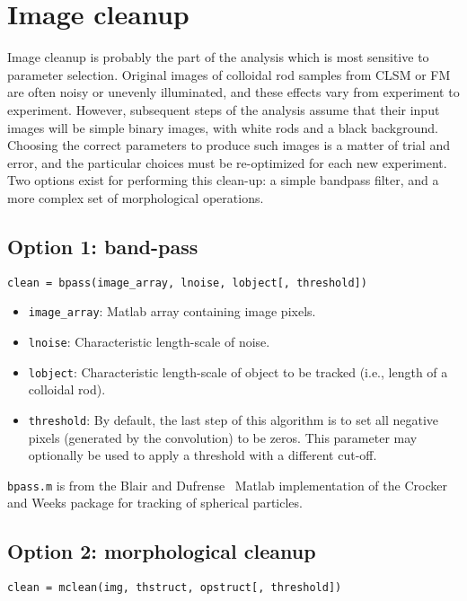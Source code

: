 \section{Image cleanup}

Image cleanup is probably the part of the analysis which is most sensitive to parameter selection.
Original images of colloidal rod samples from CLSM or FM are often noisy or unevenly illuminated, and these
effects vary from experiment to experiment.  However, subsequent steps of the analysis assume that their input
images will be simple binary images, with white rods and a black background. Choosing the correct parameters 
to produce such images is a matter of trial and error, and the particular choices must be re-optimized
for each new experiment.  Two options exist for performing this clean-up: a simple bandpass filter, 
and a more complex set of morphological operations.

\subsection{Option 1: band-pass}

\texttt{clean = bpass(image\_array, lnoise, lobject[, threshold])}

\begin{itemize}
\item \texttt{image\_array}: Matlab array containing image pixels.
\item \texttt{lnoise}: Characteristic length-scale of noise.
\item \texttt{lobject}: Characteristic length-scale of object to be tracked (i.e., length of a colloidal rod).
\item \texttt{threshold}: By default, the last step of this algorithm is to set all negative pixels (generated
by the convolution) to be zeros. This parameter may optionally be used to apply a threshold with a different cut-off.
\end{itemize}

\texttt{bpass.m} is from the Blair and Dufrense~\cite{blair-dufrense-matlab} Matlab implementation of the Crocker and Weeks
package for tracking of spherical particles.~\cite{crocker-grier-spheres}

\subsection{Option 2: morphological cleanup}

\texttt{clean = mclean(img, thstruct, opstruct[, threshold])}

